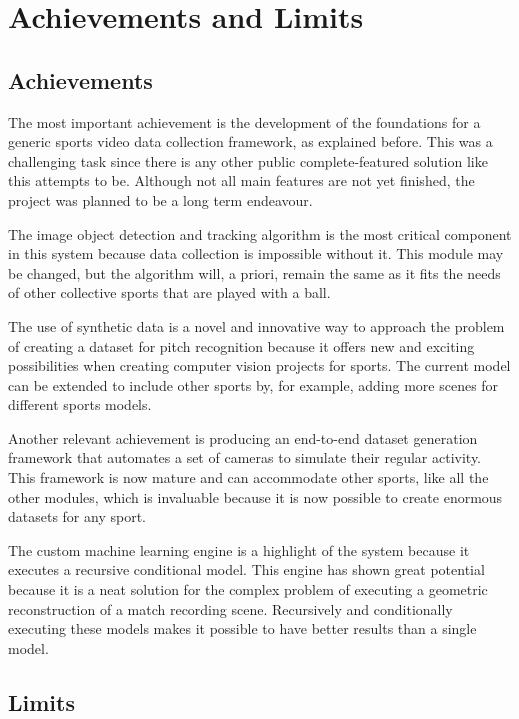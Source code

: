 \documentclass[
    11pt,
    oneside
]{report}
\begin{document}
\section{Achievements and Limits}

\subsection{Achievements}


The most important achievement is the development of the foundations for a generic sports video data collection framework, as explained before. This was a challenging task since there is any other public complete-featured solution like this attempts to be. Although not all main features are not yet finished, the project was planned to be a long term endeavour.


The image object detection and tracking algorithm is the most critical component in this system because data collection is impossible without it. This module may be changed, but the algorithm will, a priori, remain the same as it fits the needs of other collective sports that are played with a ball.


The use of synthetic data is a novel and innovative way to approach the problem of creating a dataset for pitch recognition because it offers new and exciting possibilities when creating computer vision projects for sports. The current model can be extended to include other sports by, for example, adding more scenes for different sports models.


Another relevant achievement is producing an end-to-end dataset generation framework that automates a set of cameras to simulate their regular activity. This framework is now mature and can accommodate other sports, like all the other modules, which is invaluable because it is now possible to create enormous datasets for any sport.


The custom machine learning engine is a highlight of the system because it executes a recursive conditional model. This engine has shown great potential because it is a neat solution for the complex problem of executing a geometric reconstruction of a match recording scene. Recursively and conditionally executing these models makes it possible to have better results than a single model.




\subsection{Limits}
\end{document}
